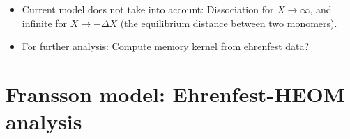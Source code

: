 \documentclass{article}
\begin{document}
\begin{itemize}
	\item Current model does not take into account: Dissociation for $X\rightarrow \infty$, and infinite for $X\rightarrow -\Delta X$ (the equilibrium distance between two monomers). 
	\item  For further analysis: Compute memory kernel from ehrenfest data?
\end{itemize}

\section{Fransson model: Ehrenfest-HEOM analysis}

\end{document}
